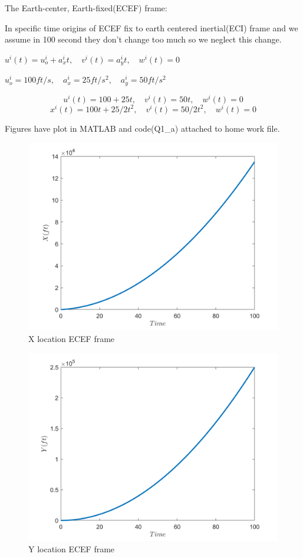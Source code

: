 The Earth-center, Earth-fixed(ECEF) frame:


In specific time origins of ECEF fix to earth centered inertial(ECI) frame and we assume in 100 second they don't change too much so we neglect this change.


$u^i(t) = u^i_o + a^i_xt,\quad v^i(t) = a^i_yt, \quad w^i(t) = 0$



$u_o^i = 100 ft/s,\quad a_x^i = 25 ft/s^2, \quad a_y^i = 50ft/s^2$

$$u^i(t) = 100 + 25t,\quad v^i(t) = 50t, \quad w^i(t) = 0$$
$$x^i(t) = 100t + 25/2t^2,\quad v^i(t) = 50/2t^2, \quad w^i(t) = 0$$

Figures have plot in MATLAB and code(Q1\_a) attached to home work file.
\begin{figure}[H]
	\caption{X location ECEF frame}
	\centering
	\includegraphics[width=12cm]{Q1/figures/X location.png}
\end{figure}
\begin{figure}[H]
	\caption{Y location ECEF frame}
	\centering
	\includegraphics[width=12cm]{Q1/figures/Y location.png}
\end{figure}

